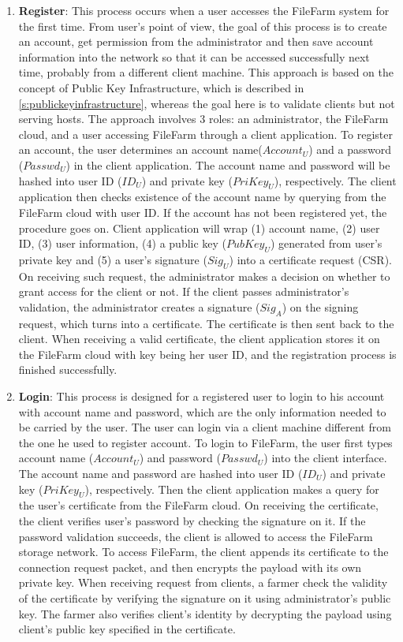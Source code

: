\begin{enumerate}
  \item \textbf{Register}: This process occurs when a user accesses the FileFarm system for the first time. From user's point of view, the goal of this process is to create an account, get permission from the administrator and then save account information into the network so that it can be accessed successfully next time, probably from a different client machine. This approach is based on the concept of Public Key Infrastructure, which is described in \ref{s:publickeyinfrastructure}, whereas the goal here is to validate clients but not serving hosts. The approach involves 3 roles: an administrator, the FileFarm cloud, and a user accessing FileFarm through a client application. To register an account, the user determines an account name($Account_{U}$) and a password ($Passwd_{U}$) in the client application. The account name and password will be hashed into user ID ($ID_{U}$) and private key ($PriKey_{U}$), respectively. The client application then checks existence of the account name by querying from the FileFarm cloud with user ID. If the account has not been registered yet, the procedure goes on. Client application will wrap (1) account name, (2) user ID, (3) user information, (4) a public key ($PubKey_{U}$) generated from user's private key and (5) a user's signature ($Sig_{U}$) into a certificate request (CSR). On receiving such request, the administrator makes a decision on whether to grant access for the client or not. If the client passes administrator's validation, the administrator creates a signature ($Sig_{A}$) on the signing request, which turns into a certificate. The certificate is then sent back to the client. When receiving a valid certificate, the client application stores it on the FileFarm cloud with key being her user ID, and the registration process is finished successfully.

  \item \textbf{Login}: This process is designed for a registered user to login to his account with account name and password, which are the only information needed to be carried by the user. The user can login via a client machine different from the one he used to register account. To login to FileFarm, the user first types account name ($Account_{U}$) and password ($Passwd_{U}$) into the client interface. The account name and password are hashed into user ID ($ID_{U}$) and private key ($PriKey_{U}$), respectively. Then the client application makes a query for the user's certificate from the FileFarm cloud. On receiving the certificate, the client verifies user's password by checking the signature on it. If the password validation succeeds, the client is allowed to access the FileFarm storage network. To access FileFarm, the client appends its certificate to the connection request packet, and then encrypts the payload with its own private key. When receiving request from clients, a farmer check the validity of the certificate by verifying the signature on it using administrator's public key. The farmer also verifies client's identity by decrypting the payload using client's public key specified in the certificate.
\end{enumerate}

